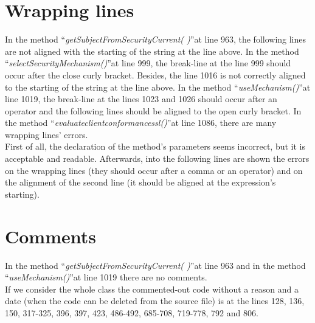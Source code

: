 \documentclass[\mainpath/main]{subfiles}
\begin{document}
\section{Wrapping lines}
\label{CodeInspectionChecklist:WrappingLines}
In the method \textquotedblleft \textit{getSubjectFromSecurityCurrent( )}\textquotedblright at line 963, the following lines are not aligned with the starting of the string at the line above.
In the method \textquotedblleft \textit{selectSecurityMechanism(\textellipsis)}\textquotedblright at line 999, the break-line at the line 999 should occur after the close curly bracket.
Besides, the line 1016 is not correctly aligned to the starting of the string at the line above.
In the method \textquotedblleft \textit{useMechanism(\textellipsis)}\textquotedblright at line 1019, the break-line at the lines 1023 and 1026 should occur after an operator and the following lines should be aligned to the open curly bracket.
In the method \textquotedblleft \textit{evaluate\textunderscore client\textunderscore conformance\textunderscore ssl(\textellipsis)}\textquotedblright at line 1086, there are many wrapping lines' errors.\\
First of all, the declaration of the method's parameters seems incorrect, but it is acceptable and readable. Afterwards, into the following lines are shown the errors on the wrapping lines (they should occur after a comma or an operator) and on the alignment of the second line (it should be aligned at the expression's starting).

\section{Comments}
\label{CodeInspectionChecklist:Comments}
In the method \textquotedblleft \textit{getSubjectFromSecurityCurrent( )}\textquotedblright at line 963 and in the method \textquotedblleft \textit{useMechanism(\textellipsis)}\textquotedblright at line 1019 there are no comments.\\
If we consider the whole class the commented-out code without a reason and a date (when the code can be deleted from the source file) is at the lines 128, 136, 150, 317-325, 396, 397, 423, 486-492, 685-708, 719-778, 792 and 806.
\end{document}
